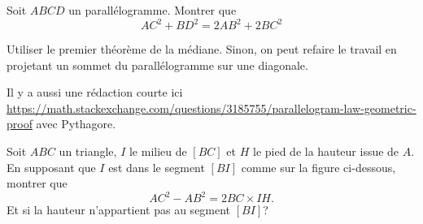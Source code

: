 \begin{exo}
Soit $ABCD$ un parallélogramme.
Montrer que
\[ AC^2+BD^2 = 2AB^2+2BC^2\]
\begin{center}
\begin{tikzpicture}
\end{tikzpicture}
\end{center}
\begin{hint}
Utiliser le premier théorème de la médiane. Sinon, on peut refaire le travail en projetant un sommet du parallélogramme sur une diagonale.
\end{hint}
\begin{sol}
Il y a aussi une rédaction courte ici \url{https://math.stackexchange.com/questions/3185755/parallelogram-law-geometric-proof} avec Pythagore.
\end{sol}
\end{exo}


\begin{exo}
Soit $ABC$ un triangle,  $I$ le milieu de $[BC]$ et $H$ le pied de la hauteur issue de $A$.
En supposant que $I$ est dans le segment $[BI]$ comme sur la figure ci-dessous, montrer que 
\[ AC^2-AB^2 = 2BC\times IH.\]
Et si la hauteur n'appartient pas au segment $[BI]$? 
\begin{center}
\end{center}
\begin{hint}

\end{hint}
\end{exo}





\begin{exo}
\begin{center}
\begin{tikzpicture}
\end{tikzpicture}
\end{center}
\begin{hint}
\end{hint}
\begin{sol}
\end{sol}
\end{exo}



